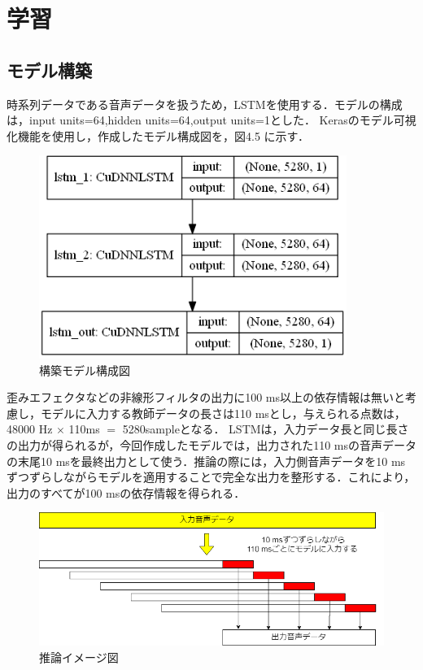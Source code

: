 \documentclass{jreport}		%
\begin{document}
\section{学習}

\subsection{モデル構築}
時系列データである音声データを扱うため，LSTMを使用する．モデルの構成は，input units=64,hidden units=64,output units=1とした．
Kerasのモデル可視化機能を使用し，作成したモデル構成図を，図4.5 に示す．

\begin{figure}[htbp]
 \begin{center}
  \includegraphics[width=100mm]{model.png}
 \end{center}
 \caption{構築モデル構成図}
 \label{fig:one}
\end{figure}

歪みエフェクタなどの非線形フィルタの出力に100 ms以上の依存情報は無いと考慮し，モデルに入力する教師データの長さは110 msとし，与えられる点数は，48000 Hz $\times$ 110ms $=$ 5280sampleとなる．
LSTMは，入力データ長と同じ長さの出力が得られるが，今回作成したモデルでは，出力された110 msの音声データの末尾10 msを最終出力として使う．推論の際には，入力側音声データを10 msずつずらしながらモデルを適用することで完全な出力を整形する．これにより，出力のすべてが100 msの依存情報を得られる．

\begin{figure}[htbp]
 \begin{center}
  \includegraphics[width=140mm]{suiron.png}
 \end{center}
 \caption{推論イメージ図}
 \label{fig:one}
\end{figure}
\end{document}
